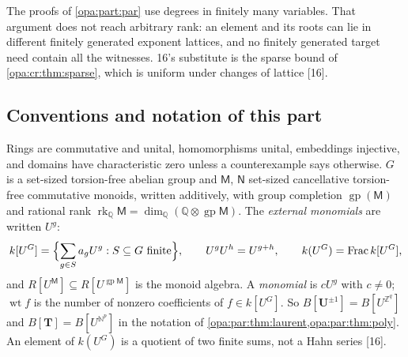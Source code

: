 \documentclass[11pt,oneside]{article}
\numberwithin{equation}{section}
\theoremstyle{definition}
\theoremstyle{remark}
\newcommand{\Q}{\mathbb Q}
\newcommand{\Z}{\mathbb Z}
\newcommand{\N}{\mathbb N}
\newcommand{\Frac}{\operatorname{Frac}}
\newcommand{\src}[1]{\textup{\textsf{\small[#1]}}}
\begin{document}
The proofs of \cref{opa:part:par} use degrees in finitely many variables. That argument does not
reach arbitrary rank: an element and its roots can lie in different finitely generated exponent
lattices, and no finitely generated target need contain all the witnesses. 16's substitute is the
sparse bound of \cref{opa:cr:thm:sparse}, which is uniform under changes of lattice \src{16}.

\subsection{Conventions and notation of this part}\label{opa:cr:sub:notation}

Rings are commutative and unital, homomorphisms unital, embeddings injective, and domains have
characteristic zero unless a counterexample says otherwise. $G$ is a set-sized torsion-free abelian
group and $\mathsf M$, $\mathsf N$ set-sized cancellative torsion-free commutative monoids, written additively,
with group completion $\operatorname{gp}(\mathsf M)$ and rational rank
$\operatorname{rk}_\Q\mathsf M=\dim_\Q(\Q\otimes\operatorname{gp}\mathsf M)$. The \emph{external monomials}
are written $U^g$:
\[
 k[U^G]=\Bigl\{\sum_{g\in S}a_gU^g:S\subseteq G\text{ finite}\Bigr\},\qquad U^gU^h=U^{g+h},\qquad
 k(U^G)=\Frac k[U^G],
\]
and $R[U^{\mathsf M}]\subseteq R[U^{\operatorname{gp}\mathsf M}]$ is the monoid algebra. A \emph{monomial} is
$cU^g$ with $c\ne0$; $\operatorname{wt}f$ is the number of nonzero coefficients of $f\in k[U^G]$. So
$B[\mathbf U^{\pm1}]=B[U^{\Z^q}]$ and $B[\mathbf T]=B[U^{\N^p}]$ in the notation of
\cref{opa:par:thm:laurent,opa:par:thm:poly}. An element of $k(U^G)$ is a quotient of two finite sums,
not a Hahn series \src{16}.
\end{document}

